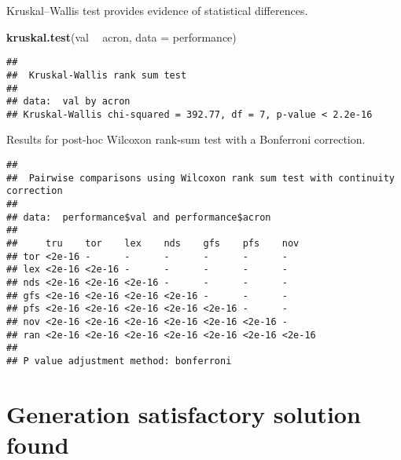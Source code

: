 \documentclass[]{book}
\newenvironment{Shaded}{\begin{snugshade}}{\end{snugshade}}
\newcommand{\DataTypeTok}[1]{\textcolor[rgb]{0.13,0.29,0.53}{#1}}
\newcommand{\KeywordTok}[1]{\textcolor[rgb]{0.13,0.29,0.53}{\textbf{#1}}}
\newcommand{\NormalTok}[1]{#1}
\newcommand{\OperatorTok}[1]{\textcolor[rgb]{0.81,0.36,0.00}{\textbf{#1}}}
\newcommand{\OtherTok}[1]{\textcolor[rgb]{0.56,0.35,0.01}{#1}}
\newcommand{\StringTok}[1]{\textcolor[rgb]{0.31,0.60,0.02}{#1}}
\begin{document}
Kruskal--Wallis test provides evidence of statistical differences.

\begin{Shaded}
\begin{Highlighting}[]
\KeywordTok{kruskal.test}\NormalTok{(val }\OperatorTok{~}\StringTok{ }\NormalTok{acron, }\DataTypeTok{data =}\NormalTok{ performance)}
\end{Highlighting}
\end{Shaded}

\begin{verbatim}
## 
##  Kruskal-Wallis rank sum test
## 
## data:  val by acron
## Kruskal-Wallis chi-squared = 392.77, df = 7, p-value < 2.2e-16
\end{verbatim}

Results for post-hoc Wilcoxon rank-sum test with a Bonferroni correction.

\begin{Shaded}
\end{Shaded}

\begin{verbatim}
## 
##  Pairwise comparisons using Wilcoxon rank sum test with continuity correction 
## 
## data:  performance$val and performance$acron 
## 
##     tru    tor    lex    nds    gfs    pfs    nov   
## tor <2e-16 -      -      -      -      -      -     
## lex <2e-16 <2e-16 -      -      -      -      -     
## nds <2e-16 <2e-16 <2e-16 -      -      -      -     
## gfs <2e-16 <2e-16 <2e-16 <2e-16 -      -      -     
## pfs <2e-16 <2e-16 <2e-16 <2e-16 <2e-16 -      -     
## nov <2e-16 <2e-16 <2e-16 <2e-16 <2e-16 <2e-16 -     
## ran <2e-16 <2e-16 <2e-16 <2e-16 <2e-16 <2e-16 <2e-16
## 
## P value adjustment method: bonferroni
\end{verbatim}

\hypertarget{generation-satisfactory-solution-found-1}{%
\section{Generation satisfactory solution found}\label{generation-satisfactory-solution-found-1}}
\end{document}
